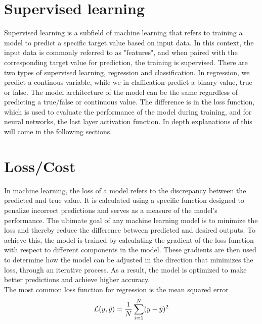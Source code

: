 \section{Supervised learning}
Supervised learning is a subfield of machine learning that refers to training a model to predict a specific target value based on input data.
In this context, the input data is commonly referred to as "features", and when paired with the corresponding target value for prediction, the training is supervised.
There are two types of supervised learning, regression and classification. 
In regression, we predict a continous variable, while we in claffication predict a binary value, true or false.
The model architecture of the model can be the same regardless of predicting a true/false or continuous value. 
The difference is in the loss function, which is used to evaluate the performance of the model during training, and for neural networks, the last layer activation function.
In depth explanations of this will come in the following sections.

\section{Loss/Cost}
In machine learning, the loss of a model refers to the discrepancy between the predicted and true value.
It is calculated using a specific function designed to penalize incorrect predictions and serves as a measure of the model's performance.
The ultimate goal of any machine learning model is to minimize the loss and thereby reduce the difference between predicted and desired outputs.
To achieve this, the model is trained by calculating the gradient of the loss function with respect to different components in the model.
These gradients are then used to determine how the model can be adjusted in the direction that minimizes the loss, through an iterative process.
As a result, the model is optimized to make better predictions and achieve higher accuracy.\\

The most common loss function for regression is the mean squared error
\begin{equation} \label{eq:mse}
    \mathcal{L}(y, \Tilde{y}) = \frac{1}{N}\sum_{i=1}^N(y-\Tilde{y})^2
\end{equation}














